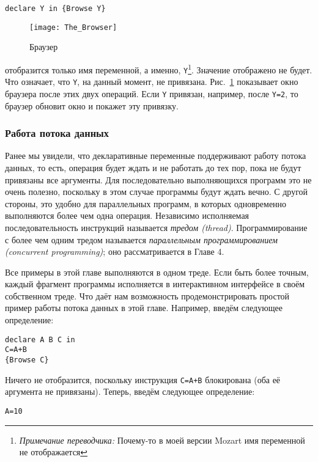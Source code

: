 \begin{lstlisting}
declare Y in {Browse Y}
\end{lstlisting}

\begin{figure}
\texttt{[image: The\_Browser]}
\caption{Браузер}
\label{figure:the_browser}
\end{figure}

отобразится только имя переменной, а именно, \lstinline|Y|\footnote{\emph{Примечание переводчика:} Почему-то в моей версии Mozart имя переменной не отображается}. Значение отображено не будет. Что означает, что \lstinline|Y|, на данный момент, не привязана. Рис.~\ref{figure:the_browser} показывает окно браузера после этих двух операций. Если \lstinline|Y| привязан, например, после \lstinline|Y=2|, то браузер обновит окно и покажет эту привязку.

\subsubsection{Работа потока данных}

Ранее мы увидели, что декларативные переменные поддерживают работу потока данных, то есть, операция будет ждать и не работать до тех пор, пока не будут привязаны все аргументы. Для последовательно выполняющихся программ это не очень полезно, поскольку в этом случае программы будут ждать вечно. С другой стороны, это удобно для параллельных программ, в которых одновременно выполняются более чем одна операция. Независимо исполняемая последовательность инструкций называется \emph{тредом (thread)}. Программирование с более чем одним тредом называется \emph{параллельным программированием (concurrent programming)}; оно рассматривается в Главе 4.

Все примеры в этой главе выполняются в одном треде. Если быть более точным, каждый фрагмент программы исполняется в интерактивном интерфейсе в своём собственном треде. Что даёт нам возможность продемонстрировать простой пример работы потока данных в этой главе. Например, введём следующее определение:

\begin{lstlisting}
declare A B C in
C=A+B
{Browse C}
\end{lstlisting}

Ничего не отобразится, поскольку инструкция \lstinline|C=A+B| блокирована (оба её аргумента не привязаны). Теперь, введём следующее определение:

\begin{lstlisting}
A=10
\end{lstlisting}

